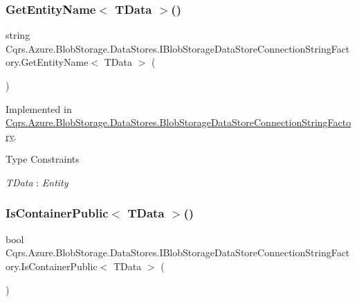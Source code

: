 \subsubsection{\texorpdfstring{Get\+Entity\+Name$<$ T\+Data $>$()}{GetEntityName< TData >()}}
{\footnotesize\ttfamily string Cqrs.\+Azure.\+Blob\+Storage.\+Data\+Stores.\+I\+Blob\+Storage\+Data\+Store\+Connection\+String\+Factory.\+Get\+Entity\+Name$<$ T\+Data $>$ (\begin{DoxyParamCaption}{ }\end{DoxyParamCaption})}



Implemented in \hyperlink{classCqrs_1_1Azure_1_1BlobStorage_1_1DataStores_1_1BlobStorageDataStoreConnectionStringFactory_a0ece7f48e0305b8397b95308dfdf2532}{Cqrs.\+Azure.\+Blob\+Storage.\+Data\+Stores.\+Blob\+Storage\+Data\+Store\+Connection\+String\+Factory}.

\begin{Desc}
\item[Type Constraints]\begin{description}
\item[{\em T\+Data} : {\em Entity}]\end{description}
\end{Desc}
\mbox{\label{interfaceCqrs_1_1Azure_1_1BlobStorage_1_1DataStores_1_1IBlobStorageDataStoreConnectionStringFactory_a328ddc36412d9d01fed52aeed545c1a4}} 
\subsubsection{\texorpdfstring{Is\+Container\+Public$<$ T\+Data $>$()}{IsContainerPublic< TData >()}}
{\footnotesize\ttfamily bool Cqrs.\+Azure.\+Blob\+Storage.\+Data\+Stores.\+I\+Blob\+Storage\+Data\+Store\+Connection\+String\+Factory.\+Is\+Container\+Public$<$ T\+Data $>$ (\begin{DoxyParamCaption}{ }\end{DoxyParamCaption})}



